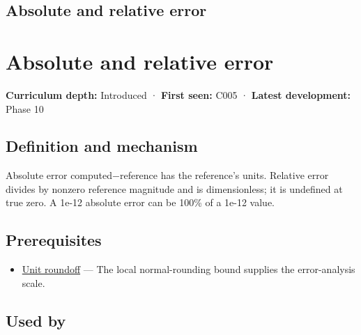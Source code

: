 \hypertarget{appendix-3ae74e89b4e6}{}
\section*{Absolute and relative error}
\chapter{Absolute and relative error}\label{appendix-3ae74e89b4e6-absolute-and-relative-error}

\textbf{Curriculum depth:} Introduced · \textbf{First seen:} C005 · \textbf{Latest development:} Phase 10

\section{Definition and mechanism}\label{appendix-3ae74e89b4e6-definition-and-mechanism}

Absolute error \textbar computed−reference\textbar{} has the reference's units. Relative error divides by nonzero reference magnitude and is dimensionless; it is undefined at true zero. A 1e-12 absolute error can be 100\% of a 1e-12 value.

\section{Prerequisites}\label{appendix-3ae74e89b4e6-prerequisites}

\begin{itemize}
\tightlist
\item
  \hyperref[appendix-bc44f7b42f42]{Unit roundoff} --- The local normal-rounding bound supplies the error-analysis scale.
\end{itemize}

\section{Used by}\label{appendix-3ae74e89b4e6-used-by}

